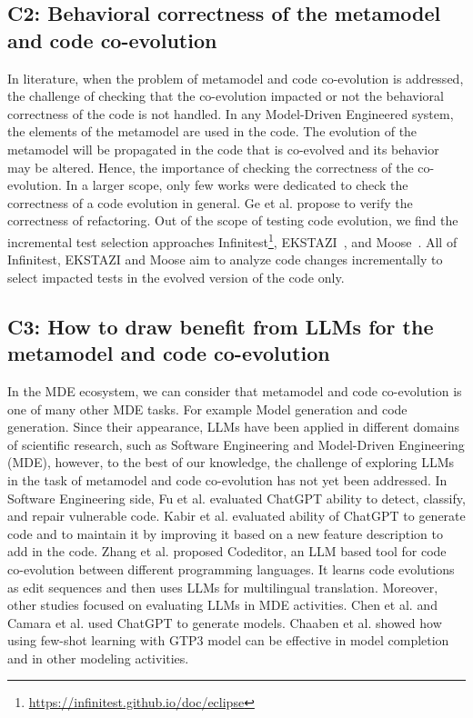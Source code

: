  

\subsection*{C2: Behavioral correctness of the metamodel and code co-evolution}

In literature, when the problem of metamodel and code co-evolution is addressed, the challenge of checking that the co-evolution impacted or not the behavioral correctness of the code is not handled. In any Model-Driven Engineered system, the elements of the metamodel are used in the code. The evolution of the metamodel will be propagated in the code that is co-evolved and its behavior may be altered. Hence, the importance of checking the correctness of the co-evolution. In a larger scope, only few works were dedicated to check the correctness of a code evolution in general. %
 Ge et al. \cite{10.1145/2568225.2568280} propose to verify the correctness of refactoring.
Out of the scope of testing code evolution, we find the incremental test selection approaches Infinitest\footnote{\url{https://infinitest.github.io/doc/eclipse}}, EKSTAZI~\cite{7203050}, and Moose~\cite{ducasse2000moose}. All of Infinitest, EKSTAZI and Moose aim to analyze code changes incrementally to select impacted tests in the evolved version of the code only.

\subsection*{C3: How to draw benefit from LLMs for the metamodel and code co-evolution}
In the MDE ecosystem, we can consider that metamodel and code co-evolution is one of many other MDE tasks. For example Model generation and code generation. Since their appearance, LLMs have been applied in different domains of scientific research, such as Software Engineering and Model-Driven Engineering (MDE), however, to the best of our knowledge, the challenge of exploring LLMs in the task of metamodel and code co-evolution has not yet been addressed. In Software Engineering side, Fu et al. \cite{fu2023chatgpt} evaluated ChatGPT ability to detect, classify, and repair vulnerable code. Kabir et al. \cite{kabir2023empirical} evaluated ability of ChatGPT to generate code and to maintain it by improving it based on a new feature description to add in the code. Zhang et al. \cite{zhang2023multilingual} proposed Codeditor, an LLM based tool for code co-evolution between different programming languages. It learns code evolutions as edit sequences and then uses LLMs for multilingual translation.
Moreover, other studies focused on evaluating LLMs in MDE activities. 
Chen et al. \cite{10344012} and Camara et al. \cite{camara2023assessment} used ChatGPT to generate models.
Chaaben et al. \cite{chaaben2023towards} showed how using few-shot learning with GTP3 model can be effective in model completion and in other modeling activities. 
%
